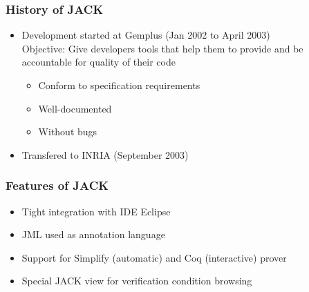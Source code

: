 \documentclass{beamer}
\begin{document}
\begin{frame}\frametitle{History of JACK}
\begin{itemize}
\item Development started at Gemplus (Jan 2002 to April 2003)\\
Objective: Give developers tools that help them to provide and be
accountable for quality of their code
\begin{itemize}
\item Conform to specification requirements
\item Well-documented
\item Without bugs
\end{itemize}
\item Transfered to INRIA (September 2003)
\end{itemize}
\end{frame}



\begin{frame}\frametitle{Features of JACK}
\begin{itemize}
\item Tight integration with IDE Eclipse
\item JML used as annotation language
\item Support for Simplify (automatic) and Coq (interactive) prover
\item Special JACK view for verification condition browsing
\end{itemize}
\end{frame}
\end{document}
